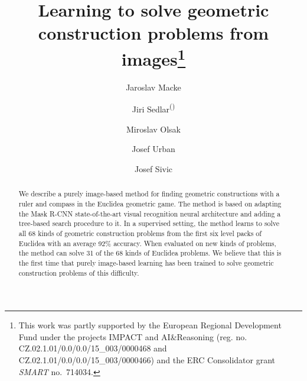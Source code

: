 \documentclass[runningheads]{llncs}
\newcommand{\maskrcnn}{Mask {R-CNN}\xspace}
\begin{document}
\title{Learning to solve geometric construction problems from 
images\thanks{This work was partly supported by the European Regional Development Fund under the projects IMPACT and AI\&Reasoning (reg. no. CZ.02.1.01/0.0/0.0/15\_003/0000468 and CZ.02.1.01/0.0/0.0/15\_003/0000466)
and the ERC Consolidator grant \emph{SMART} no.~714034.
}
}

\author{Jaroslav Macke \and
Jiri Sedlar\textsuperscript{(\Letter)} \and
Miroslav Olsak \and
Josef Urban \and
Josef Sivic
}

\maketitle
\begin{abstract}
We describe a purely image-based method for finding geometric constructions with a ruler and compass in the Euclidea geometric game. The method is based on adapting the \maskrcnn state-of-the-art visual recognition neural architecture and adding a tree-based search procedure to it. In a supervised setting, the method learns to solve all 68 kinds of geometric construction problems from the first six level packs of Euclidea with an average 92\% accuracy. When evaluated on new kinds of problems, the method can solve 31 of the 68 kinds of Euclidea problems. We believe that this is the first time that purely image-based learning has been trained to solve geometric construction problems of this difficulty.



\end{abstract}









\let\Origclearpage\clearpage
\let\clearpage\relax



\let\clearpage\Origclearpage
\end{document}
